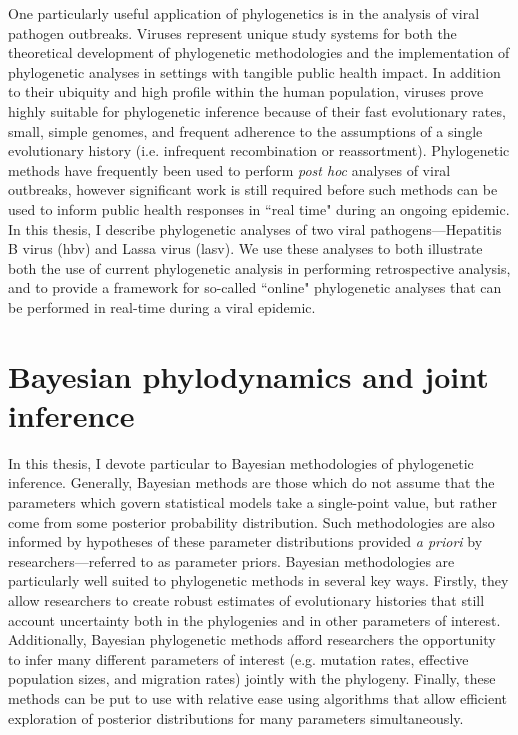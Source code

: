 One particularly useful application of phylogenetics is in the analysis of viral pathogen outbreaks.
Viruses represent unique study systems for both the theoretical development of phylogenetic methodologies and the implementation of phylogenetic analyses in settings with tangible public health impact.
In addition to their ubiquity and high profile within the human population, viruses prove highly suitable for phylogenetic inference because of their fast evolutionary rates, small, simple genomes, and frequent adherence to the assumptions of a single evolutionary history (i.e. infrequent recombination or reassortment).
Phylogenetic methods have frequently been used to perform \textit{post hoc} analyses of viral outbreaks, however significant work is still required before such methods can be used to inform public health responses in ``real time" during an ongoing epidemic.
In this thesis, I describe phylogenetic analyses of two viral pathogens---Hepatitis B virus (\gls{hbv}) and Lassa virus (\gls{lasv}).
We use these analyses to both illustrate both the use of current phylogenetic analysis in performing retrospective analysis, and to provide a framework for so-called ``online" phylogenetic analyses that can be performed in real-time during a viral epidemic.

\section{Bayesian phylodynamics and joint inference}

In this thesis, I devote particular to Bayesian methodologies of phylogenetic inference.
Generally, Bayesian methods are those which do not assume that the parameters which govern statistical models take a single-point value, but rather come from some posterior probability distribution.
Such methodologies are also informed by hypotheses of these parameter distributions provided \textit{a priori} by researchers---referred to as parameter priors.
Bayesian methodologies are particularly well suited to phylogenetic methods in several key ways.
Firstly, they allow researchers to create robust estimates of evolutionary histories that still account uncertainty both in the phylogenies and in other parameters of interest.
Additionally, Bayesian phylogenetic methods afford researchers the opportunity to infer many different parameters of interest (e.g. mutation rates, effective population sizes, and migration rates) jointly with the phylogeny.
Finally, these methods can be put to use with relative ease using algorithms that allow efficient exploration of posterior distributions for many parameters simultaneously.

